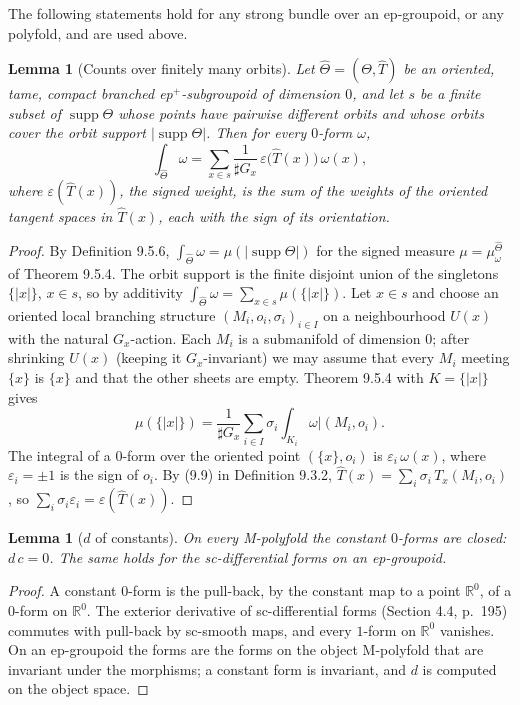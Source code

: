 \documentclass[11pt,a4paper]{article}
\theoremstyle{plain}
\newtheorem{lemma}[theorem]{Lemma}
\theoremstyle{definition}
\theoremstyle{remark}
\newcommand{\R}{\mathbb{R}}
\newcommand{\abs}[1]{\lvert #1\rvert}
\newcommand{\card}{\sharp}
\newcommand{\supp}{\operatorname{supp}}
\begin{document}
The following statements hold for any strong bundle over an ep-groupoid, or any polyfold, and are used
above.

\begin{lemma}[Counts over finitely many orbits]\label{lem:finite}
Let $\hat\Theta=(\Theta,\hat T)$ be an oriented, tame, compact branched ep$^+$-subgroupoid of
dimension $0$, and let $s$ be a finite subset of $\supp\Theta$ whose points have pairwise different
orbits and whose orbits cover the orbit support $\abs{\supp\Theta}$. Then for every $0$-form $\omega$,
\[
  \int_{\hat\Theta}\omega=\sum_{x\in s}\frac1{\card G_x}\,\varepsilon\bigl(\hat T(x)\bigr)\,\omega(x),
\]
where $\varepsilon(\hat T(x))$, the \emph{signed weight}, is the sum of the weights of the oriented
tangent spaces in $\hat T(x)$, each with the sign of its orientation.
\end{lemma}

\begin{proof}
By Definition 9.5.6, $\int_{\hat\Theta}\omega=\mu(\abs{\supp\Theta})$ for the signed measure
$\mu=\mu^{\hat\Theta}_\omega$ of Theorem 9.5.4. The orbit support is the finite disjoint union of the
singletons $\{\abs x\}$, $x\in s$, so by additivity $\int_{\hat\Theta}\omega=\sum_{x\in s}\mu(\{\abs x\})$.
Let $x\in s$ and choose an oriented local branching structure $(M_i,o_i,\sigma_i)_{i\in I}$ on a neighbourhood
$U(x)$ with the natural $G_x$-action. Each $M_i$ is a submanifold of dimension $0$; after shrinking
$U(x)$ (keeping it $G_x$-invariant) we may assume that every $M_i$ meeting $\{x\}$ is $\{x\}$ and that
the other sheets are empty. Theorem 9.5.4 with $K=\{\abs x\}$ gives
\[
  \mu(\{\abs x\})=\frac1{\card G_x}\sum_{i\in I}\sigma_i\int_{K_i}\omega|(M_i,o_i).
\]
The integral of a $0$-form over the oriented point $(\{x\},o_i)$ is $\varepsilon_i\,\omega(x)$, where
$\varepsilon_i=\pm1$ is the sign of $o_i$. By (9.9) in Definition 9.3.2,
$\hat T(x)=\sum_i\sigma_i\,T_x(M_i,o_i)$, so $\sum_i\sigma_i\varepsilon_i=\varepsilon(\hat T(x))$.
\end{proof}

\begin{lemma}[$d$ of constants]\label{lem:const}
On every M-polyfold the constant $0$-forms are closed: $d\,c=0$. The same holds for the sc-differential
forms on an ep-groupoid.
\end{lemma}

\begin{proof}
A constant $0$-form is the pull-back, by the constant map to a point $\R^0$, of a $0$-form on $\R^0$.
The exterior derivative of sc-differential forms (Section 4.4, p.~195) commutes with pull-back by
sc-smooth maps, and every $1$-form on $\R^0$ vanishes. On an ep-groupoid the forms are the forms on the
object M-polyfold that are invariant under the morphisms; a constant form is invariant, and $d$ is
computed on the object space.
\end{proof}
\end{document}
